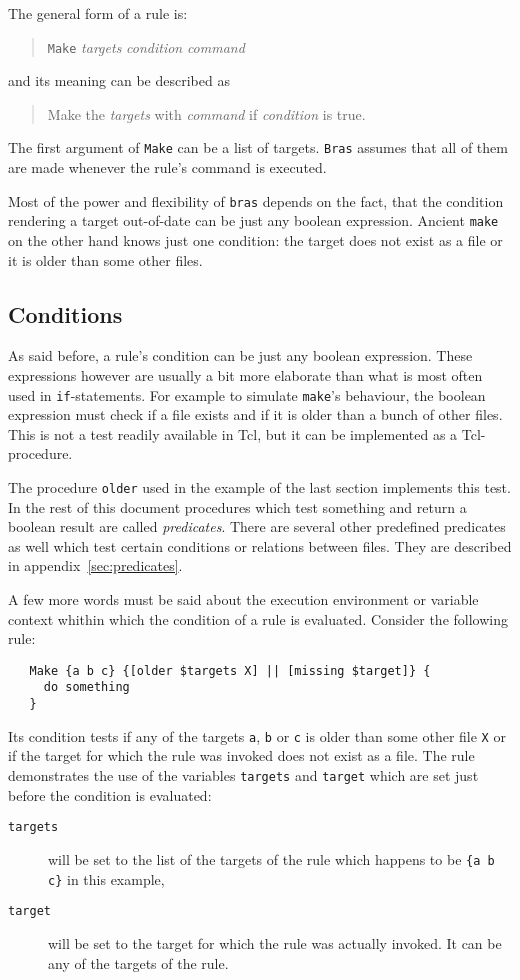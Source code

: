 \documentclass[11pt]{scrartcl}
\newcommand{\bras}{\texttt{bras}}
\newcommand{\Bras}{\texttt{Bras}}
\newcommand{\make}{\texttt{make}}
\begin{document}
The general form of a rule is:
\begin{quote}
  \texttt{Make} \textit{targets} \textit{condition} \textit{command}
\end{quote}
and its meaning can be described as
\begin{quote}
  Make the \textit{targets} with \textit{command} if
  \textit{condition} is true.
\end{quote}

The first argument of \texttt{Make} can be a list of targets.
\Bras{} assumes that all of them are made whenever the rule's command
is executed.

Most of the power and flexibility of \bras{} depends on the fact, that
the condition rendering a target out-of-date can be just any
boolean expression. Ancient \make{} on the other hand knows just one
condition: the target does not exist as a file or it is older than
some other files.


\subsection{Conditions}

As said before, a rule's condition can be just any boolean expression.
These expressions however are usually a bit more elaborate than what
is most often used in \texttt{if}-statements. For example to simulate
\make's behaviour, the boolean expression must check if a file exists
and if it is older than a bunch of other files. This is not a test
readily available in Tcl, but it can be implemented as a
Tcl-procedure.

The procedure \texttt{older} used in the example of the last section
implements this test. In the rest of this document procedures which
test something and return a boolean result are called
\textit{predicates}. There are several other predefined predicates as
well which test certain conditions or relations between files. They
are described in appendix~\ref{sec:predicates}.

A few more words must be said about the execution environment or
variable context whithin which the condition of a rule is evaluated.
Consider the following rule:
\begin{verbatim}
   Make {a b c} {[older $targets X] || [missing $target]} {
     do something
   }
\end{verbatim}
Its condition tests if any of the targets \texttt{a}, \texttt{b} or
\texttt{c} is older than some other file \texttt{X} or if the target
for which the rule was invoked does not exist as a file. The rule
demonstrates the use of the variables \texttt{targets} and
\texttt{target} which are set just before the condition is evaluated:
\begin{description}
\item[\texttt{targets}] will be set
to the list of the targets of the rule which happens to be \texttt{\{a
  b c\}} in this example,
\item[\texttt{target}] will be set to the target for which the rule
  was actually invoked. It can be any of the targets of the rule.
\end{description}
\end{document}
